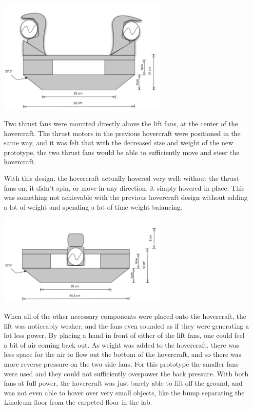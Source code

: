 \begin{center}
  \includegraphics[width=85mm]{imageSources/Front2.png}
\end{center}
\label{Front2}

Two thrust fans were mounted directly above the lift fans, at the center of the hovercraft. The thrust motors in the previous
hovercraft were positioned in the same way, and it was felt that with the decreased size and weight of the new prototype, the 
two thrust fans would be able to sufficiently move and steer the hovercraft.

With this design, the hovercraft actually hovered very well: without the thrust fans on, it didn't spin, or move in 
any direction, it simply hovered in place. This was something not achievable with the previous hovercraft design 
without adding a lot of weight and spending a lot of time weight balancing.

\begin{center}
  \includegraphics[width=85mm]{imageSources/SideView2.png}
\end{center}
\label{Side2}

When all of the other necessary components were placed onto the hovercraft, the lift was noticeably weaker, and the fans
even sounded as if they were generating a lot less power. By placing a hand in front of either of the lift fans, one could feel
a bit of air coming back out. As weight was added to the hovercraft, there was less space for the air to flow out the bottom
of the hovercraft, and so there was more reverse pressure on the two side fans. For this prototype the smaller fans were used
and they could not sufficiently overpower the back pressure. With both fans at full power, the hovercraft was just barely able
to lift off the ground, and was not even able to hover over very small objects, like the bump separating the Linoleum floor
from the carpeted floor in the lab. 

